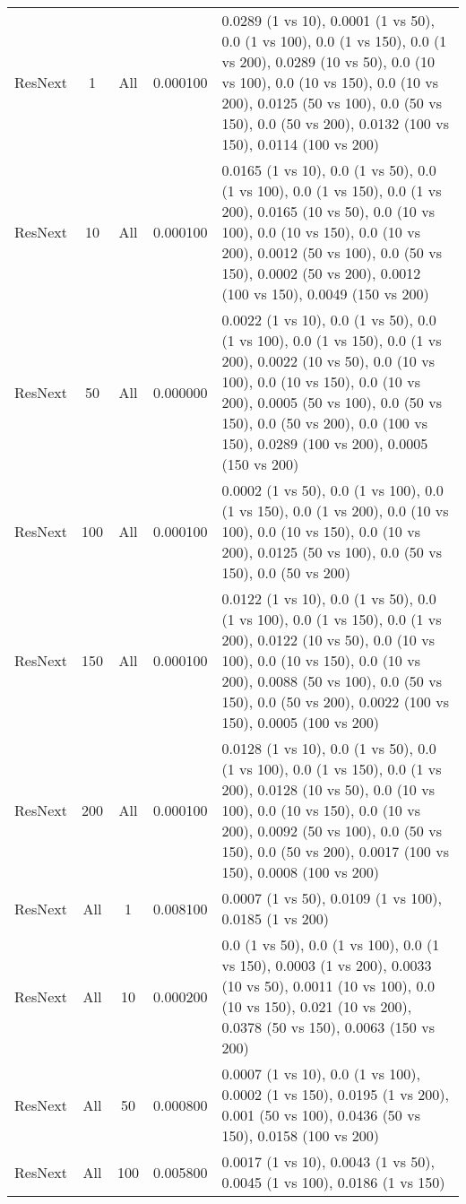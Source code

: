 \begin{tabular}{|l|c|c|c|p{7cm}|}
ResNext & 1 & All & 0.000100 & 0.0289 (1 vs 10), 0.0001 (1 vs 50), 0.0 (1 vs 100), 0.0 (1 vs 150), 0.0 (1 vs 200), 0.0289 (10 vs 50), 0.0 (10 vs 100), 0.0 (10 vs 150), 0.0 (10 vs 200), 0.0125 (50 vs 100), 0.0 (50 vs 150), 0.0 (50 vs 200), 0.0132 (100 vs 150), 0.0114 (100 vs 200) \\
ResNext & 10 & All & 0.000100 & 0.0165 (1 vs 10), 0.0 (1 vs 50), 0.0 (1 vs 100), 0.0 (1 vs 150), 0.0 (1 vs 200), 0.0165 (10 vs 50), 0.0 (10 vs 100), 0.0 (10 vs 150), 0.0 (10 vs 200), 0.0012 (50 vs 100), 0.0 (50 vs 150), 0.0002 (50 vs 200), 0.0012 (100 vs 150), 0.0049 (150 vs 200) \\
ResNext & 50 & All & 0.000000 & 0.0022 (1 vs 10), 0.0 (1 vs 50), 0.0 (1 vs 100), 0.0 (1 vs 150), 0.0 (1 vs 200), 0.0022 (10 vs 50), 0.0 (10 vs 100), 0.0 (10 vs 150), 0.0 (10 vs 200), 0.0005 (50 vs 100), 0.0 (50 vs 150), 0.0 (50 vs 200), 0.0 (100 vs 150), 0.0289 (100 vs 200), 0.0005 (150 vs 200) \\
ResNext & 100 & All & 0.000100 & 0.0002 (1 vs 50), 0.0 (1 vs 100), 0.0 (1 vs 150), 0.0 (1 vs 200), 0.0 (10 vs 100), 0.0 (10 vs 150), 0.0 (10 vs 200), 0.0125 (50 vs 100), 0.0 (50 vs 150), 0.0 (50 vs 200) \\
ResNext & 150 & All & 0.000100 & 0.0122 (1 vs 10), 0.0 (1 vs 50), 0.0 (1 vs 100), 0.0 (1 vs 150), 0.0 (1 vs 200), 0.0122 (10 vs 50), 0.0 (10 vs 100), 0.0 (10 vs 150), 0.0 (10 vs 200), 0.0088 (50 vs 100), 0.0 (50 vs 150), 0.0 (50 vs 200), 0.0022 (100 vs 150), 0.0005 (100 vs 200) \\
ResNext & 200 & All & 0.000100 & 0.0128 (1 vs 10), 0.0 (1 vs 50), 0.0 (1 vs 100), 0.0 (1 vs 150), 0.0 (1 vs 200), 0.0128 (10 vs 50), 0.0 (10 vs 100), 0.0 (10 vs 150), 0.0 (10 vs 200), 0.0092 (50 vs 100), 0.0 (50 vs 150), 0.0 (50 vs 200), 0.0017 (100 vs 150), 0.0008 (100 vs 200) \\
ResNext & All & 1 & 0.008100 & 0.0007 (1 vs 50), 0.0109 (1 vs 100), 0.0185 (1 vs 200) \\
ResNext & All & 10 & 0.000200 & 0.0 (1 vs 50), 0.0 (1 vs 100), 0.0 (1 vs 150), 0.0003 (1 vs 200), 0.0033 (10 vs 50), 0.0011 (10 vs 100), 0.0 (10 vs 150), 0.021 (10 vs 200), 0.0378 (50 vs 150), 0.0063 (150 vs 200) \\
ResNext & All & 50 & 0.000800 & 0.0007 (1 vs 10), 0.0 (1 vs 100), 0.0002 (1 vs 150), 0.0195 (1 vs 200), 0.001 (50 vs 100), 0.0436 (50 vs 150), 0.0158 (100 vs 200) \\
ResNext & All & 100 & 0.005800 & 0.0017 (1 vs 10), 0.0043 (1 vs 50), 0.0045 (1 vs 100), 0.0186 (1 vs 150) \\

\end{tabular}
